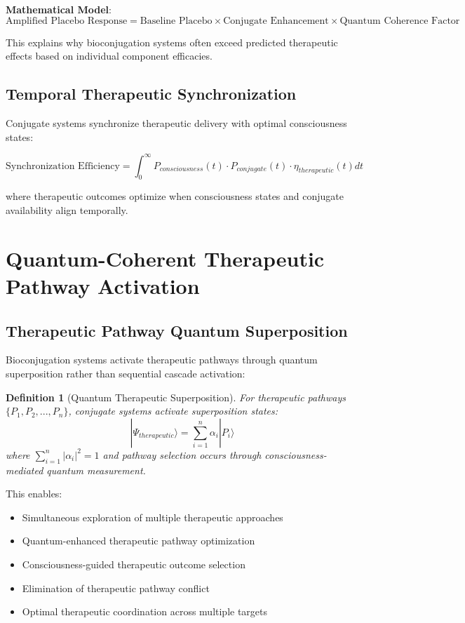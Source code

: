 \documentclass[12pt,a4paper]{article}
\newtheorem{definition}{Definition}
\begin{document}
\textbf{Mathematical Model}:
\begin{equation}
\text{Amplified Placebo Response} = \text{Baseline Placebo} \times \text{Conjugate Enhancement} \times \text{Quantum Coherence Factor}
\end{equation}

This explains why bioconjugation systems often exceed predicted therapeutic effects based on individual component efficacies.

\subsection{Temporal Therapeutic Synchronization}

Conjugate systems synchronize therapeutic delivery with optimal consciousness states:

\begin{equation}
\text{Synchronization Efficiency} = \int_0^{\infty} P_{consciousness}(t) \cdot P_{conjugate}(t) \cdot \eta_{therapeutic}(t) dt
\end{equation}

where therapeutic outcomes optimize when consciousness states and conjugate availability align temporally.

\section{Quantum-Coherent Therapeutic Pathway Activation}

\subsection{Therapeutic Pathway Quantum Superposition}

Bioconjugation systems activate therapeutic pathways through quantum superposition rather than sequential cascade activation:

\begin{definition}[Quantum Therapeutic Superposition]
For therapeutic pathways $\{P_1, P_2, ..., P_n\}$, conjugate systems activate superposition states:
\begin{equation}
|\Psi_{therapeutic}\rangle = \sum_{i=1}^n \alpha_i |P_i\rangle
\end{equation}
where $\sum_{i=1}^n |\alpha_i|^2 = 1$ and pathway selection occurs through consciousness-mediated quantum measurement.
\end{definition}

This enables:
\begin{itemize}
\item Simultaneous exploration of multiple therapeutic approaches
\item Quantum-enhanced therapeutic pathway optimization
\item Consciousness-guided therapeutic outcome selection
\item Elimination of therapeutic pathway conflict
\item Optimal therapeutic coordination across multiple targets
\end{itemize}
\end{document}
